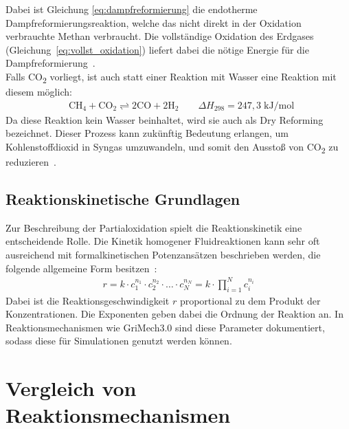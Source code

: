 \documentclass[footmark=none]{tubaf-thesis}
\begin{document}
            Dabei ist Gleichung \ref{eq:dampfreformierung} die endotherme Dampfreformierungsreaktion, welche das nicht direkt in der Oxidation verbrauchte Methan verbraucht. Die vollständige Oxidation des Erdgases (Gleichung~\ref{eq:vollst_oxidation}) liefert dabei die nötige Energie für die Dampfreformierung~\cite{POX_Erdgas}.\\ 
            Falls CO\textsubscript{2} vorliegt, ist auch statt einer Reaktion mit Wasser eine Reaktion mit diesem möglich:
            \begin{align}
                &\mathrm{CH_4 + CO_2 \rightleftharpoons 2CO + 2H_2} \qquad \Delta H_{298} = 247,3 \;\mathrm{kJ/mol}~\label{eq:dampfreformierung}
            \end{align}
            Da diese Reaktion kein Wasser beinhaltet, wird sie auch als Dry Reforming bezeichnet. Dieser Prozess kann zukünftig Bedeutung erlangen, um Kohlenstoffdioxid in Syngas umzuwandeln, und somit den  Ausstoß von CO\textsubscript{2} zu reduzieren~\cite{LESACHE2022100970}. 
        \section{Reaktionskinetische Grundlagen}
            Zur Beschreibung der Partialoxidation spielt die Reaktionskinetik eine entscheidende Rolle. Die Kinetik homogener Fluidreaktionen kann sehr oft ausreichend mit formalkinetischen Potenzansätzen beschrieben werden, die folgende allgemeine Form besitzen~\cite{Emig_Klemm_2017}:
            \begin{align}
                r = k\cdot c_1^{n_1}\cdot c_2^{n_2}\cdot{\dots}\cdot c_N^{n_N} = k \cdot \prod_{i=1}^N c_i^{n_i}
            \end{align}
            Dabei ist die Reaktionsgeschwindigkeit $r$ proportional zu dem Produkt der Konzentrationen. Die Exponenten geben dabei die Ordnung der Reaktion an. In Reaktionsmechanismen wie GriMech3.0 sind diese Parameter dokumentiert, sodass diese für Simulationen genutzt werden können.
\chapter{Vergleich von Reaktionsmechanismen}
\end{document}
